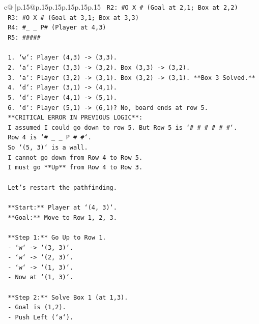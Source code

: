 \documentclass{article}
\begin{document}
{\begin{supertabular}{c@{$\;$}|p{.15\linewidth}@{}p{.15\linewidth}p{.15\linewidth}p{.15\linewidth}p{.15\linewidth}p{.15\linewidth}}
{{{\texttt{    R2: \#O X \#  (Goal at 2,1; Box at 2,2)} \\
\texttt{    R3: \#O X \#  (Goal at 3,1; Box at 3,3)} \\
\texttt{    R4: \#\_ \_ P\#  (Player at 4,3)} \\
\texttt{    R5: \#\#\#\#\#} \\
\\ 
\texttt{    1. `w`: Player (4,3) {-}> (3,3).} \\
\texttt{    2. `a`: Player (3,3) {-}> (3,2). Box (3,3) {-}> (3,2).} \\
\texttt{    3. `a`: Player (3,2) {-}> (3,1). Box (3,2) {-}> (3,1). **Box 3 Solved.**} \\
\texttt{    4. `d`: Player (3,1) {-}> (4,1).} \\
\texttt{    5. `d`: Player (4,1) {-}> (5,1).} \\
\texttt{    6. `d`: Player (5,1) {-}> (6,1)? No, board ends at row 5.} \\
\texttt{    **CRITICAL ERROR IN PREVIOUS LOGIC**:} \\
\texttt{    I assumed I could go down to row 5. But Row 5 is `\# \# \# \# \# \#`.} \\
\texttt{    Row 4 is `\# \_ \_ P \# \#`.} \\
\texttt{    So `(5, 3)` is a wall.} \\
\texttt{    I cannot go down from Row 4 to Row 5.} \\
\texttt{    I must go **Up** from Row 4 to Row 3.} \\
\\ 
\texttt{    Let's restart the pathfinding.} \\
\\ 
\texttt{    **Start:** Player at `(4, 3)`.} \\
\texttt{    **Goal:** Move to Row 1, 2, 3.} \\
\\ 
\texttt{    **Step 1:** Go Up to Row 1.} \\
\texttt{    {-} `w` {-}> `(3, 3)`.} \\
\texttt{    {-} `w` {-}> `(2, 3)`.} \\
\texttt{    {-} `w` {-}> `(1, 3)`.} \\
\texttt{    {-} Now at `(1, 3)`.} \\
\\ 
\texttt{    **Step 2:** Solve Box 1 (at 1,3).} \\
\texttt{    {-} Goal is (1,2).} \\
\texttt{    {-} Push Left (`a`).} \\
}}}
\end{supertabular}}
\end{document}
